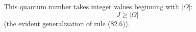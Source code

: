 This quantum number takes integer values beginning with $|\Omega|$:
\begin{equation}J\geqslant|\Omega|\tag{83.2}\end{equation}
(the evident generalization of rule (82.6)).
